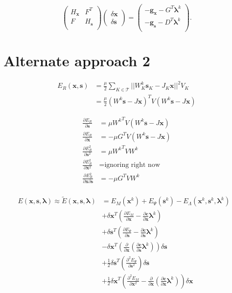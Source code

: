 \documentclass[letterpaper,12pt]{article}
\theoremstyle{remark}
\newcommand{\Th}{\mathcal{T}}
\newcommand{\x}{\mathbf{x}}
\newcommand{\C}{\mathbf{c}}
\newcommand{\s}{\mathbf{s}}
\newcommand{\la}{\mathbf{\lambda}}
\newcommand{\dx}{\delta \x}
\newcommand{\ds}{\delta \s}
\newcommand{\El}{E_\Lambda}
\newcommand{\Hx}{ {H_\x} }
\newcommand{\Hs}{ {H_\s} }
\newcommand{\gx}{ {\mathbf{g}_\x} }
\newcommand{\gs}{ {\mathbf{g}_\s} }
\begin{document}
\begin{equation}
\begin{pmatrix}
\Hx & F^T \\
F & \Hs  \\
\end{pmatrix}
\begin{pmatrix}
\dx \\
\ds
\end{pmatrix} =
\begin{pmatrix}
-\gx -G^T \la^k \\
-\gs -D^T \la^k \\
\end{pmatrix}.
\end{equation}

\section{Alternate approach 2}

\begin{equation}
\begin{split}
E_R(\x,\s) &= \frac{\mu}{2} \sum_{K \in \Th} ||W^k_K\s_K - J_K\x||^2 V_K \\
&= \frac{\mu}{2} (W^k\s - J\x)^T V (W^k\s - J\x)
\end{split}
\end{equation}

\begin{align}
\frac{\partial E_R}{\partial \s} &= \mu {W^k}^T V (W^k\s - J\x) \\
\frac{\partial E_R}{\partial \x} &= -\mu G^T V (W^k\s - J\x) \\
\frac{\partial E^2_R}{\partial \s^2} &= \mu {W^k}^T V W^k\\
\frac{\partial E^2_R}{\partial \x^2} &= \text{ignoring right now} \\
\frac{\partial E^2_R}{\partial \x \partial \s} &= -\mu G^T V W^k\\
\end{align}

\begin{align*}
E(\x,\s,\la) \approx \tilde{E}(\x,\s,\la) &= E_M(\x^k) + E_\Psi(\s^k) - \El(\x^k,\s^k,\la^k) \\
&+ 
\dx^T \left(
	\frac{\partial E_M}{\partial \x} 
 -  \frac{\partial \C}{\partial \x} \la^k \right) & \\
&+ \ds^T \left(
	\frac{\partial E_\Psi}{\partial \s} 
 -  \frac{\partial \C}{\partial \s} \la^k \right)  & \\
& - \dx^T \left(
  \frac{\partial}{\partial \x} \left(\frac{\partial \C}{\partial \s} \la^k\right) \right)\ds & \\
& + \frac{1}{2} \ds^T \left(\frac{\partial^2 E_\Psi}{\partial \s^2} \right)\ds & \\
& + \frac{1}{2}\dx^T \left(\frac{\partial^2 E_M}{\partial \x^2} -
\frac{\partial}{\partial \x} \left(\frac{\partial \C}{\partial \x} \la^k\right)
\right)\dx & \\
\end{align*}
\end{document}
